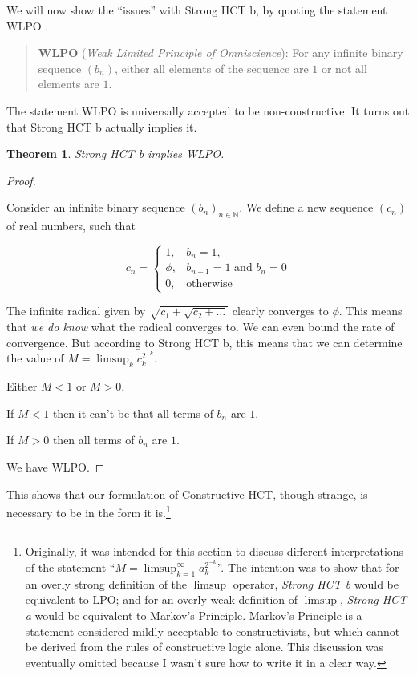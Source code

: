 \documentclass[
]{article}
\theoremstyle{theorem}
\newtheorem{theorem}{Theorem}
\theoremstyle{lemma}
\theoremstyle{corollary}
\theoremstyle{remark}
\theoremstyle{definition}
\begin{document}
We will now show the ``issues'' with Strong HCT b, by quoting the statement WLPO \cite{bishop1967}.

\begin{quote}
\textbf{WLPO} (\emph{Weak Limited Principle of Omniscience}): For any infinite binary sequence \((b_n)\), either all elements of the sequence are \(1\) or not all elements are \(1\).
\end{quote}

The statement WLPO is universally accepted to be non-constructive. It turns out that Strong HCT b actually implies it.

\begin{theorem}
\label{strong-hct-implies-lpo}
Strong HCT b implies WLPO.

\end{theorem}
\begin{proof}

\hypertarget{proof-16}{%
\label{proof-16}}
Consider an infinite binary sequence \((b_n)_{n \in \mathbb N}\). We define a new sequence \((c_n)\) of real numbers, such that

\[c_n = \begin{cases}
1,& b_n = 1,\\
\phi,& b_{n-1}=1\text{ and } b_n = 0\\
0,& \text{otherwise}
\end{cases}\]

The infinite radical given by \(\sqrt{c_1 + \sqrt{c_2 + \dots}}\) clearly converges to \(\phi\). This means that \emph{we do know} what the radical converges to. We can even bound the rate of convergence. But according to Strong HCT b, this means that we can determine the value of \(M = \limsup_k c_k^{2^{-k}}\).

Either \(M < 1\) or \(M > 0\).

If \(M < 1\) then it can't be that all terms of \(b_n\) are \(1\).

If \(M > 0\) then all terms of \(b_n\) are \(1\).

We have WLPO.

\end{proof}
This shows that our formulation of Constructive HCT, though strange, is necessary to be in the form it is.\footnote{Originally, it was intended for this section to discuss different interpretations of the statement ``\(M = \limsup_{k=1}^\infty a_k^{2^{-k}}\)''. The intention was to show that for an overly strong definition of the \(\limsup\) operator, \emph{Strong HCT b} would be equivalent to LPO; and for an overly weak definition of \(\limsup\), \emph{Strong HCT a} would be equivalent to Markov's Principle. Markov's Principle is a statement considered mildly acceptable to constructivists, but which cannot be derived from the rules of constructive logic alone. This discussion was eventually omitted because I wasn't sure how to write it in a clear way.}
\end{document}
